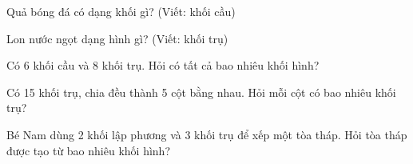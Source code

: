 \begin{ex} %
Quả bóng đá có dạng khối gì? (Viết: khối cầu)
\end{ex}

\begin{ex} %
Lon nước ngọt dạng hình gì? (Viết: khối trụ)
\end{ex}

\begin{ex} %
Có 6 khối cầu và 8 khối trụ. Hỏi có tất cả bao nhiêu khối hình?
\end{ex}

\begin{ex} %
Có 15 khối trụ, chia đều thành 5 cột bằng nhau. Hỏi mỗi cột có bao nhiêu khối trụ?
\end{ex}

\begin{ex} %
Bé Nam dùng 2 khối lập phương và 3 khối trụ để xếp một tòa tháp. Hỏi tòa tháp được tạo từ bao nhiêu khối hình?
\end{ex}
